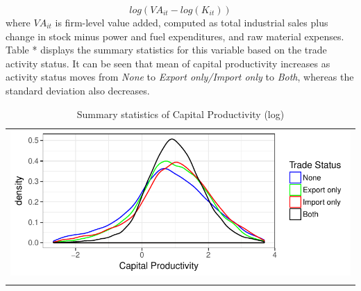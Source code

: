\documentclass[11pt]{article}
\begin{document}
$$ log(VA_{it} - log(K_{it}))$$
where $VA_{it}$ is firm-level value added, computed as total industrial sales plus
change in stock minus power and fuel expenditures, and raw material
expenses. Table * displays the summary statistics for this variable
based on the trade activity status. It can be seen that mean of capital
productivity increases as activity status moves from \textit{None} to
\textit{Export only/Import only} to \textit{Both}, whereas the
standard deviation also decreases.  
\begin{center}
\begin{table}[htp]
\caption{Summary statistics of Capital Productivity (log)}
\label{tab:capprod}
\begin{tabular}{c}
 \includegraphics{./PICS/denscapprod.pdf}   \\ 
   \\  
\end{tabular}
\end{table}
\end{center}
\end{document}
